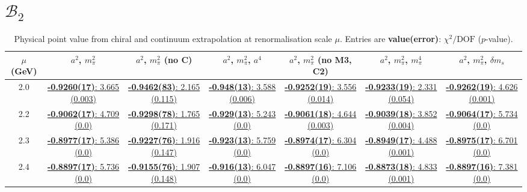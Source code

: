\documentclass[12pt]{extarticle}
\begin{document}
\section{$\mathcal{B}_2$}
\begin{table}[h!]
\begin{center}
\begin{tabular}{|c|c|c|c|c|c|c|}
\hline
$\mu$ (GeV) & $a^2$, $m_\pi^2$& $a^2$, $m_\pi^2$ (no C)& $a^2$, $m_\pi^2$, $a^4$& $a^2$, $m_\pi^2$ (no M3, C2)& $a^2$, $m_\pi^2$, $m_\pi^4$& $a^2$, $m_\pi^2$, $\delta m_s$\\
\hline
2.0& \hyperlink{VVmAA/SUSY/bag_a2m2_20.pdf.1}{\textbf{-0.9260(17)}: 3.665 (0.003)} & \hyperlink{VVmAA/SUSY/bag_a2m2noC_20.pdf.1}{\textbf{-0.9462(83)}: 2.165 (0.115)} & \hyperlink{VVmAA/SUSY/bag_a2a4m2_20.pdf.1}{\textbf{-0.948(13)}: 3.588 (0.006)} & \hyperlink{VVmAA/SUSY/bag_a2m2mcut_20.pdf.1}{\textbf{-0.9252(19)}: 3.556 (0.014)} & \hyperlink{VVmAA/SUSY/bag_a2m2m4_20.pdf.1}{\textbf{-0.9233(19)}: 2.331 (0.054)} & \hyperlink{VVmAA/SUSY/bag_a2m2delm_20.pdf.1}{\textbf{-0.9262(19)}: 4.626 (0.001)}\\
2.2& \hyperlink{VVmAA/SUSY/bag_a2m2_22.pdf.1}{\textbf{-0.9062(17)}: 4.709 (0.0)} & \hyperlink{VVmAA/SUSY/bag_a2m2noC_22.pdf.1}{\textbf{-0.9298(78)}: 1.765 (0.171)} & \hyperlink{VVmAA/SUSY/bag_a2a4m2_22.pdf.1}{\textbf{-0.929(13)}: 5.243 (0.0)} & \hyperlink{VVmAA/SUSY/bag_a2m2mcut_22.pdf.1}{\textbf{-0.9061(18)}: 4.644 (0.003)} & \hyperlink{VVmAA/SUSY/bag_a2m2m4_22.pdf.1}{\textbf{-0.9039(18)}: 3.852 (0.004)} & \hyperlink{VVmAA/SUSY/bag_a2m2delm_22.pdf.1}{\textbf{-0.9064(17)}: 5.734 (0.0)}\\
2.3& \hyperlink{VVmAA/SUSY/bag_a2m2_23.pdf.1}{\textbf{-0.8977(17)}: 5.386 (0.0)} & \hyperlink{VVmAA/SUSY/bag_a2m2noC_23.pdf.1}{\textbf{-0.9227(76)}: 1.916 (0.147)} & \hyperlink{VVmAA/SUSY/bag_a2a4m2_23.pdf.1}{\textbf{-0.923(13)}: 5.759 (0.0)} & \hyperlink{VVmAA/SUSY/bag_a2m2mcut_23.pdf.1}{\textbf{-0.8974(17)}: 6.304 (0.0)} & \hyperlink{VVmAA/SUSY/bag_a2m2m4_23.pdf.1}{\textbf{-0.8949(17)}: 4.488 (0.001)} & \hyperlink{VVmAA/SUSY/bag_a2m2delm_23.pdf.1}{\textbf{-0.8975(17)}: 6.701 (0.0)}\\
2.4& \hyperlink{VVmAA/SUSY/bag_a2m2_24.pdf.1}{\textbf{-0.8897(17)}: 5.736 (0.0)} & \hyperlink{VVmAA/SUSY/bag_a2m2noC_24.pdf.1}{\textbf{-0.9155(76)}: 1.907 (0.148)} & \hyperlink{VVmAA/SUSY/bag_a2a4m2_24.pdf.1}{\textbf{-0.916(13)}: 6.047 (0.0)} & \hyperlink{VVmAA/SUSY/bag_a2m2mcut_24.pdf.1}{\textbf{-0.8897(16)}: 7.106 (0.0)} & \hyperlink{VVmAA/SUSY/bag_a2m2m4_24.pdf.1}{\textbf{-0.8873(18)}: 4.833 (0.001)} & \hyperlink{VVmAA/SUSY/bag_a2m2delm_24.pdf.1}{\textbf{-0.8897(16)}: 7.381 (0.0)}\\
\hline
\end{tabular}
\caption{Physical point value from chiral and continuum extrapolation at renormalisation scale $\mu$. Entries are \textbf{value(error)}: $\chi^2/\text{DOF}$ ($p$-value).}
\end{center}
\end{table}
\end{document}

